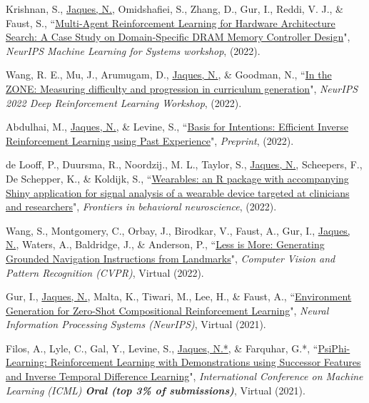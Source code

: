 \documentclass[paper=letter,fontsize=11pt]{scrartcl} %
\newcommand{\PaperEntry}[6]{
		\noindent #1, ``\href{#6}{#2}", \textit{#3}, #4 (#5).}
\begin{document}
\begin{etaremune}
\item \PaperEntry{Krishnan, S., \underline{Jaques, N.}, Omidshafiei, S., Zhang, D., Gur, I., Reddi, V. J., \& Faust, S.}{Multi-Agent Reinforcement Learning for Hardware Architecture Search: A Case Study on Domain-Specific DRAM Memory Controller Design}{NeurIPS Machine Learning for Systems workshop}{}{2022}{https://arxiv.org/abs/2211.16385}

\item \PaperEntry{Wang, R. E., Mu, J., Arumugam, D., \underline{Jaques, N.}, \& Goodman, N.}{In the ZONE: Measuring difficulty and  progression in curriculum generation}{NeurIPS 2022 Deep Reinforcement Learning Workshop}{}{2022}{https://openreview.net/pdf?id=SgBHmHMctfd}

\item \PaperEntry{Abdulhai, M., \underline{Jaques, N.}, \& Levine, S.}{Basis for Intentions: Efficient Inverse Reinforcement Learning using Past Experience}{Preprint}{}{2022}{https://arxiv.org/abs/2208.04919}

\item \PaperEntry{de Looff, P., Duursma, R., Noordzij., M. L., Taylor, S., \underline{Jaques, N.}, Scheepers, F., De Schepper, K., \& Koldijk, S.}{Wearables: an R package with accompanying Shiny application for signal analysis of a wearable device targeted at clinicians and researchers}{Frontiers in behavioral neuroscience}{}{2022}{https://www.frontiersin.org/articles/10.3389/fnbeh.2022.856544/pdf}

\item \PaperEntry{Wang, S., Montgomery, C., Orbay, J., Birodkar, V., Faust, A., Gur, I., \underline{Jaques, N.}, Waters, A., Baldridge, J., \& Anderson, P.}{Less is More: Generating Grounded Navigation Instructions from Landmarks}{Computer Vision and Pattern Recognition (CVPR)}{Virtual}{2022}{https://arxiv.org/abs/2111.12872}

\item \PaperEntry{Gur, I., \underline{Jaques, N.}, Malta, K., Tiwari, M., Lee, H., \& Faust, A.}{Environment Generation for Zero-Shot Compositional Reinforcement Learning}{Neural Information Processing Systems (NeurIPS)}{Virtual}{2021}{https://papers.nips.cc/paper/2021/file/218344619d8fb95d504ccfa11804073f-Paper.pdf }

\item \PaperEntry{Filos, A., Lyle, C., Gal, Y., Levine, S., \underline{Jaques, N.*}, \& Farquhar, G.*}{PsiPhi-Learning: Reinforcement Learning with Demonstrations using Successor Features and Inverse Temporal Difference Learning}{International Conference on Machine Learning (ICML) \textbf{Oral (top 3\% of submissions)}}{Virtual}{2021}{https://arxiv.org/pdf/2102.12560.pdf}


\end{etaremune}
\end{document}
